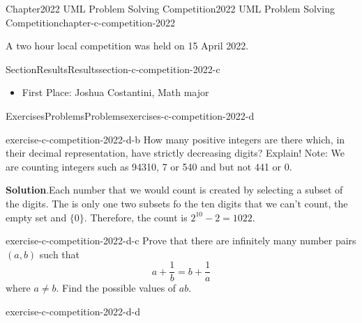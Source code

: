 \documentclass[oneside,10pt,]{book}
\newcommand{\blocktitlefont}{\relax}
\numberwithin{equation}{section}
\begin{document}
\typeout{************************************************}
%
\begin{chapterptx}{Chapter}{2022 UML Problem Solving Competition}{}{2022 UML Problem Solving Competition}{}{}{chapter-c-competition-2022}
\renewcommand*{\chaptername}{Chapter}
\begin{introduction}{}%
A two hour local competition was held on 15 April 2022.%
\end{introduction}%
%
%
\typeout{************************************************}
\typeout{************************************************}
%
\begin{sectionptx}{Section}{Results}{}{Results}{}{}{section-c-competition-2022-c}
%
\begin{itemize}[label=\textbullet]
\item{}First Place:  Joshua Costantini, Math major%
\end{itemize}
%
\end{sectionptx}
%
%
\typeout{************************************************}
\typeout{************************************************}
%
\begin{exercises-section}{Exercises}{Problems}{}{Problems}{}{}{exercises-c-competition-2022-d}
\begin{divisionexercise}{1}{}{}{exercise-c-competition-2022-d-b}%
How many positive integers are there which, in their decimal representation, have strictly decreasing digits? Explain!  Note:  We are counting integers such as  94310, 7 or 540 and but not 441 or 0.%
\par\smallskip%
\noindent\textbf{\blocktitlefont Solution}.\hypertarget{solution-c-competition-2022-d-b-b}{}\quad{}Each number that we would count is created by selecting a subset of the digits.  The is only one two subsets fo the ten digits that we can't count, the empty set and  \(\{0\}\).  Therefore, the count is \(2^10-2=1022\).%
\end{divisionexercise}%
\begin{divisionexercise}{2}{}{}{exercise-c-competition-2022-d-c}%
Prove that there are infinitely many number pairs \((a,b)\) such that%
\begin{equation*}
a+\frac{1}{b}=b+\frac{1}{a}
\end{equation*}
where \(a\neq b\). Find the possible values of \(a b\).%
\end{divisionexercise}%
\begin{divisionexercise}{3}{}{}{exercise-c-competition-2022-d-d}%

\end{divisionexercise}
\end{exercises-section}
\end{chapterptx}
\end{document}
